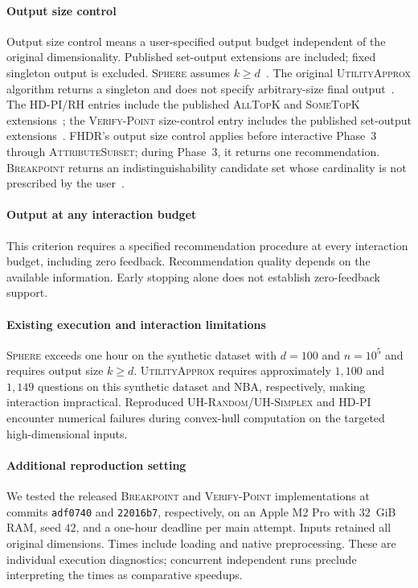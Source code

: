 \documentclass[conference]{IEEEtran}
\theoremstyle{definition}
\theoremstyle{plain}
\begin{document}
\paragraph{Output size control}
Output size control means a user-specified output budget independent of the original dimensionality. Published set-output extensions are included; fixed singleton output is excluded. \textsc{Sphere} assumes $k\geq d$~\cite{XW18}. The original \textsc{UtilityApprox} algorithm returns a singleton and does not specify arbitrary-size final output~\cite{NL12}. The \textsc{HD-PI}/\textsc{RH} entries include the published \textsc{AllTopK} and \textsc{SomeTopK} extensions~\cite{WWX21}; the \textsc{Verify-Point} size-control entry includes the published set-output extensions~\cite{CW23}. FHDR's output size control applies before interactive Phase~3 through \textsc{AttributeSubset}; during Phase~3, it returns one recommendation. \textsc{Breakpoint} returns an indistinguishability candidate set whose cardinality is not prescribed by the user~\cite{LA25}.

\paragraph{Output at any interaction budget}
This criterion requires a specified recommendation procedure at every interaction budget, including zero feedback. Recommendation quality depends on the available information. Early stopping alone does not establish zero-feedback support.

\paragraph{Existing execution and interaction limitations}
\textsc{Sphere} exceeds one hour on the synthetic dataset with $d=100$ and $n=10^5$ and requires output size $k\geq d$. \textsc{UtilityApprox} requires approximately $1{,}100$ and $1{,}149$ questions on this synthetic dataset and NBA, respectively, making interaction impractical. Reproduced \textsc{UH-Random}/\textsc{UH-Simplex} and \textsc{HD-PI} encounter numerical failures during convex-hull computation on the targeted high-dimensional inputs.

\paragraph{Additional reproduction setting}
We tested the released \textsc{Breakpoint} and \textsc{Verify-Point} implementations at commits \texttt{adf0740} and \texttt{22016b7}, respectively, on an Apple M2 Pro with $32$~GiB RAM, seed $42$, and a one-hour deadline per main attempt. Inputs retained all original dimensions. Times include loading and native preprocessing. These are individual execution diagnostics; concurrent independent runs preclude interpreting the times as comparative speedups.
\end{document}
